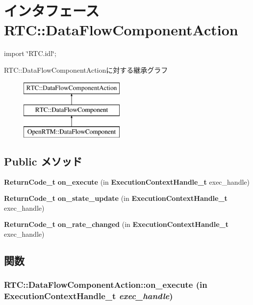 \section{インタフェース RTC::DataFlowComponentAction}
\label{interfaceRTC_1_1DataFlowComponentAction}


{\ttfamily import \char`\"{}RTC.idl\char`\"{};}

RTC::DataFlowComponentActionに対する継承グラフ\begin{figure}[H]
\begin{center}
\leavevmode
\includegraphics[height=3cm]{interfaceRTC_1_1DataFlowComponentAction}
\end{center}
\end{figure}
\subsection*{Public メソッド}
\begin{DoxyCompactItemize}
\item 
{\bf ReturnCode\_\-t} {\bf on\_\-execute} (in {\bf ExecutionContextHandle\_\-t} exec\_\-handle)
\item 
{\bf ReturnCode\_\-t} {\bf on\_\-state\_\-update} (in {\bf ExecutionContextHandle\_\-t} exec\_\-handle)
\item 
{\bf ReturnCode\_\-t} {\bf on\_\-rate\_\-changed} (in {\bf ExecutionContextHandle\_\-t} exec\_\-handle)
\end{DoxyCompactItemize}


\subsection{関数}
\subsubsection[{on\_\-execute}]{ RTC::DataFlowComponentAction::on\_\-execute (in {\bf ExecutionContextHandle\_\-t} {\em exec\_\-handle})}\label{interfaceRTC_1_1DataFlowComponentAction_a70a1d7f32e03c719dd8949ea5d0be214}
